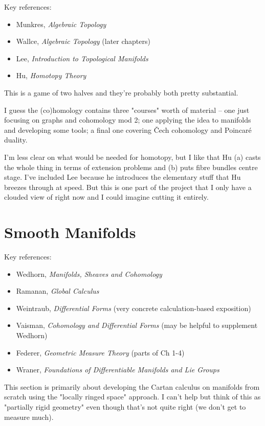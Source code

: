 \documentclass[article]{article}
\begin{document}
Key references:
\begin{itemize}
	\item{Munkres, \textit{Algebraic Topology}}
	\item{Wallce, \textit{Algebraic Topology} (later chapters)}
	\item{Lee, \textit{Introduction to Topological Manifolds}}
	\item{Hu, \textit{Homotopy Theory}}
\end{itemize}

This is a game of two halves and they're probably both pretty substantial.

I guess the (co)homology contains three "courses" worth of material -- one just focusing on graphs and cohomology mod 2; one applying the idea to manifolds and developing some tools; a final one covering \v{C}ech cohomology and Poincar\'e duality. 

I'm less clear on what would be needed for homotopy, but I like that Hu (a) casts the whole thing in terms of extension problems and (b) puts fibre bundles centre stage. I've included Lee because he introduces the elementary stuff that Hu breezes through at speed. But this is one part of the project that I only have a clouded view of right now and I could imagine cutting it entirely.

\section{Smooth Manifolds}

Key references:
\begin{itemize}
	\item{Wedhorn, \textit{Manifolds, Sheaves and Cohomology}}
	\item{Ramanan, \textit{Global Calculus}}
	\item{Weintraub, \textit{Differential Forms} (very concrete calculation-based exposition)}
	\item{Vaisman, \textit{Cohomology and Differential Forms} (may be helpful to supplement Wedhorn)}
	\item{Federer, \textit{Geometric Measure Theory} (parts of Ch 1-4)}
	\item{Wraner, \textit{Foundations of Differentiable Manifolds and Lie Groups}}
\end{itemize}

This section is primarily about developing the Cartan calculus on manifolds from scratch using the "locally ringed space" approach. I can't help but think of this as "partially rigid geometry" even though that's not quite right (we don't get to measure much).
\end{document}
